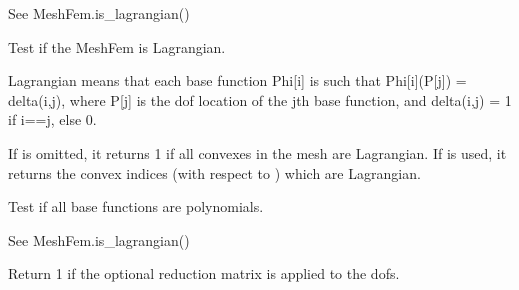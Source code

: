 \documentclass[a4paper,11pt,english]{sphinxmanual}
\begin{document}
\begin{fulllineitems}
\begin{fulllineitems}
See MeshFem.is\_lagrangian()

\end{fulllineitems}


\begin{fulllineitems}
\label{\detokenize{python/cmdref_MeshFem:getfem.MeshFem.is_lagrangian}}
Test if the MeshFem is Lagrangian.

Lagrangian means that each base function Phi{[}i{]} is such that
Phi{[}i{]}(P{[}j{]}) = delta(i,j), where P{[}j{]} is the dof location of
the jth base function, and delta(i,j) = 1 if i==j, else 0.

If  is omitted, it returns 1 if all convexes in the mesh
are Lagrangian. If  is used, it returns the convex indices
(with respect to ) which are Lagrangian.

\end{fulllineitems}


\begin{fulllineitems}
\label{\detokenize{python/cmdref_MeshFem:getfem.MeshFem.is_polynomial}}
Test if all base functions are polynomials.

See MeshFem.is\_lagrangian()

\end{fulllineitems}


\begin{fulllineitems}
\label{\detokenize{python/cmdref_MeshFem:getfem.MeshFem.is_reduced}}
Return 1 if the optional reduction matrix is applied to the dofs.

\end{fulllineitems}



\end{fulllineitems}
\end{document}
